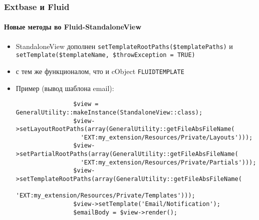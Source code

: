 \begin{frame}[fragile]
	\frametitle{Extbase и Fluid}
	\framesubtitle{Новые методы во Fluid-StandaloneView}

	\lstset{basicstyle=\tiny\ttfamily}

	\begin{itemize}

		\item StandaloneView дополнен
			\texttt{setTemplateRootPaths(\$templatePaths)} и
			\texttt{setTemplate(\$templateName, \$throwException = TRUE)}

		\item с тем же функционалом, что и cObject \texttt{FLUIDTEMPLATE}

		\item Пример (вывод шаблона email):

			\begin{lstlisting}
				$view = GeneralUtility::makeInstance(StandaloneView::class);
				$view->setLayoutRootPaths(array(GeneralUtility::getFileAbsFileName(
				  'EXT:my_extension/Resources/Private/Layouts')));
				$view->setPartialRootPaths(array(GeneralUtility::getFileAbsFileName(
				  'EXT:my_extension/Resources/Private/Partials')));
				$view->setTemplateRootPaths(array(GeneralUtility::getFileAbsFileName(
				  'EXT:my_extension/Resources/Private/Templates')));
				$view->setTemplate('Email/Notification');
				$emailBody = $view->render();
			\end{lstlisting}

	\end{itemize}

\end{frame}


